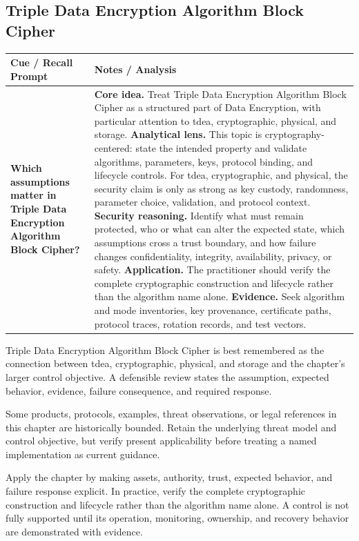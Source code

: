 \documentclass[11pt]{article}
\newcommand{\CornellHeader}{%
\rowcolor{Navy}\color{white}\bfseries Cue / Recall Prompt & \color{white}\bfseries Notes / Analysis\\\hline}
\newcommand{\CornellRow}[2]{%
\cellcolor{CueGray}\RaggedRight\textbf{#1} & \RaggedRight #2\\\hline}
\begin{document}
\subsection*{Triple Data Encryption Algorithm Block Cipher}
\begin{longtable}{>{\RaggedRight\arraybackslash}p{}|>{\RaggedRight\arraybackslash}p{}}
\CornellHeader
\CornellRow{Which assumptions matter in Triple Data Encryption Algorithm Block Cipher?}{\textbf{Core idea.} Treat Triple Data Encryption Algorithm Block Cipher as a structured part of Data Encryption, with particular attention to tdea, cryptographic, physical, and storage. \textbf{Analytical lens.} This topic is cryptography-centered: state the intended property and validate algorithms, parameters, keys, protocol binding, and lifecycle controls. For tdea, cryptographic, and physical, the security claim is only as strong as key custody, randomness, parameter choice, validation, and protocol context. \textbf{Security reasoning.} Identify what must remain protected, who or what can alter the expected state, which assumptions cross a trust boundary, and how failure changes confidentiality, integrity, availability, privacy, or safety. \textbf{Application.} The practitioner should verify the complete cryptographic construction and lifecycle rather than the algorithm name alone. \textbf{Evidence.} Seek algorithm and mode inventories, key provenance, certificate paths, protocol traces, rotation records, and test vectors.}
\end{longtable}
\begin{topicsummary}
Triple Data Encryption Algorithm Block Cipher is best remembered as the connection between tdea, cryptographic, physical, and storage and the chapter's larger control objective. A defensible review states the assumption, expected behavior, evidence, failure consequence, and required response.
\end{topicsummary}
\begin{historybox}
Some products, protocols, examples, threat observations, or legal references in this chapter are historically bounded. Retain the underlying threat model and control objective, but verify present applicability before treating a named implementation as current guidance.
\end{historybox}
\begin{defensebox}
Apply the chapter by making assets, authority, trust, expected behavior, and failure response explicit. In practice, verify the complete cryptographic construction and lifecycle rather than the algorithm name alone. A control is not fully supported until its operation, monitoring, ownership, and recovery behavior are demonstrated with evidence.
\end{defensebox}
\end{document}
